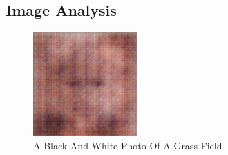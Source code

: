 \documentclass{article}%
\begin{document}
%
\subsection{Image Analysis}%
\label{subsec:ImageAnalysis}%


\begin{figure}[h!]%
\centering%
\includegraphics[width=150px]{500_fake_images/samples_5_124.png}%
\caption{A Black And White Photo Of A Grass Field}%
\end{figure}

%
\end{document}
